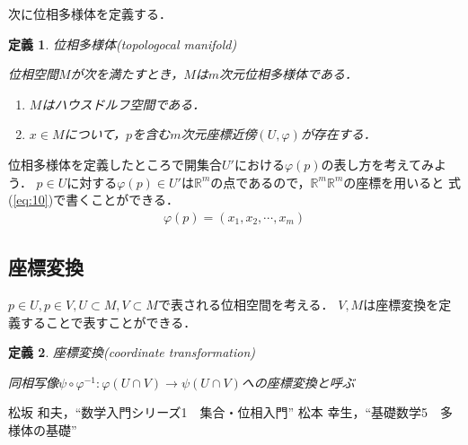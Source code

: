 \documentclass[11pt,a4j]{jarticle}
\newtheorem{dfn}{定義}
\begin{document}
次に位相多様体を定義する．
\begin{dfn}位相多様体(topologocal manifold)
    
    位相空間$M$が次を満たすとき，$M$は$m$次元位相多様体である．
    \begin{enumerate}
        \renewcommand{\labelenumi}{(\roman{enumi})}
        \item $M$はハウスドルフ空間である．
        \item $x \in M$について，$p$を含む$m$次元座標近傍$(U,\varphi)$が存在する．
    \end{enumerate}
\end{dfn}

位相多様体を定義したところで開集合$U'$における$\varphi(p)$の表し方を考えてみよう．
$p \in U$に対する$\varphi(p) \in U'$は$\mathbb{R}^m$の点であるので，$\mathbb{R}^m$$\mathbb{R}^m$の座標を用いると
式(\ref{eq:10})で書くことができる．
\begin{eqnarray}
    \label{eq:10}
    \varphi(p)=(x_1,x_2,\cdots,x_m)
\end{eqnarray}

\subsection{座標変換}
$p \in U,p \in V,U \subset M,V \subset M$で表される位相空間を考える．
$V,M$は座標変換を定義することで表すことができる．
\begin{dfn}
    座標変換(coordinate transformation)

   同相写像$\psi \circ \varphi^{-1}:\varphi(U \cap V)\rightarrow\psi(U \cap V)$への座標変換と呼ぶ 
\end{dfn}

\begin{thebibliography}{2}
    松坂 和夫，“数学入門シリーズ1　集合・位相入門”
    松本 幸生，“基礎数学5　多様体の基礎”
\end{thebibliography}
\end{document}
